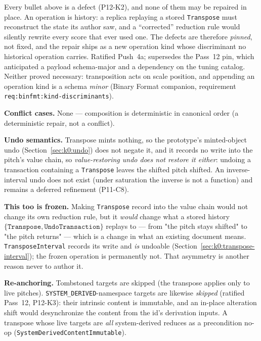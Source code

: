 \documentclass[11pt,letterpaper]{report}
\newcounter{requirement}[chapter]
\begin{document}
\begin{rationale}
  Every bullet above is a defect (P12-K2), and none of them may be repaired in
  place. An operation is history: a replica replaying a stored
  \texttt{Transpose} must reconstruct the state its author saw, and a
  ``corrected'' reduction rule would silently rewrite every score that ever
  used one. The defects are therefore \emph{pinned}, not fixed, and the repair
  ships as a new operation kind whose discriminant no historical operation
  carries. Ratified Push~4a; supersedes the Pass~12 pin, which anticipated a
  payload schema-major and a dependency on the tuning catalog. Neither proved
  necessary: transposition acts on scale position, and appending an operation
  kind is a schema \emph{minor} (Binary Format companion, requirement
  \texttt{req:binfmt:kind-discriminants}).
\end{rationale}

\textbf{Conflict cases.} None --- composition is deterministic in canonical order
(a deterministic repair, not a conflict).

\textbf{Undo semantics.} Transpose mints nothing, so the prototype's minted-object
undo (Section~\ref{sec:k0:undo}) does not negate it, and it records no write into
the pitch's value chain, so \emph{value-restoring undo does not restore it
either}: undoing a transaction containing a \texttt{Transpose} leaves the shifted
pitch shifted. An inverse-interval undo does not exist (under saturation the
inverse is not a function) and remains a deferred refinement (P11-C8).

\textbf{This too is frozen.} Making \texttt{Transpose} record into the value
chain would not change its own reduction rule, but it \emph{would} change what a
stored history $\{\texttt{Transpose}, \texttt{UndoTransaction}\}$ replays to ---
from "the pitch stays shifted" to "the pitch returns" --- which is a change in
what an existing document means. \texttt{TransposeInterval} records its write and
\emph{is} undoable (Section~\ref{sec:k0:transpose-interval}); the frozen
operation is permanently not. That asymmetry is another reason never to author
it.

\textbf{Re-anchoring.} Tombstoned targets are skipped (the transpose applies only
to live pitches). \texttt{SYSTEM\_DERIVED}-namespace targets are likewise
\emph{skipped} (ratified Pass~12, P12-K3): their intrinsic content is immutable,
and an in-place alteration shift would desynchronize the content from the id's
derivation inputs. A transpose whose live targets are \emph{all} system-derived
reduces as a precondition no-op (\texttt{SystemDerivedContentImmutable}).
\end{document}
